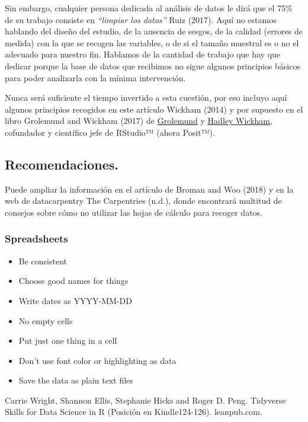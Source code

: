 \documentclass[
  letterpaper,
  DIV=11,
  numbers=noendperiod]{scrreprt}
\providecommand{\tightlist}{%
  \setlength{\itemsep}{0pt}\setlength{\parskip}{0pt}}\usepackage{longtable,booktabs,array}
\begin{document}
Sin embargo, cualquier persona dedicada al análisis de datos le dirá que
el 75\% de su trabajo consiste en \emph{``limpiar los datos''} Ruiz
(2017). Aquí no estamos hablando del diseño del estudio, de la ausencia
de sesgos, de la calidad (errores de medida) con la que se recogen las
variables, o de si el tamaño muestral es o no el adecuado para nuestro
fin. Hablamos de la cantidad de trabajo que hay que dedicar porque la
base de datos que recibimos no sigue algunos principios básicos para
poder analizarla con la mínima intervención.

Nunca será suficiente el tiempo invertido a esta cuestión, por eso
incluyo aquí algunos principios recogidos en este artículo Wickham
(2014) y por supuesto en el libro Grolemund and Wickham (2017) de
\href{https://www.rstudio.com/authors/garrett-grolemund/}{Grolemund} y
\href{https://hadley.nz/}{Hadley Wickham}, cofundador y científico jefe
de RStudio™ (ahora Posit™).

\hypertarget{recomendaciones.}{%
\subsection{Recomendaciones.}\label{recomendaciones.}}

Puede ampliar la información en el artículo de Broman and Woo (2018) y
en la web de datacarpentry The Carpentries (n.d.), donde encontrará
multitud de consejos sobre cómo no utilizar las hojas de cálculo para
recoger datos.

\hypertarget{spreadsheets}{%
\subsubsection{Spreadsheets}\label{spreadsheets}}

\begin{itemize}
\tightlist
\item
  Be consistent
\item
  Choose good names for things
\item
  Write dates as YYYY-MM-DD
\item
  No empty cells
\item
  Put just one thing in a cell
\item
  Don't use font color or highlighting as data
\item
  Save the data as plain text files
\end{itemize}

Carrie Wright, Shannon Ellis, Stephanie Hicks and Roger D. Peng.
Tidyverse Skills for Data Science in R (Posición en Kindle124-126).
leanpub.com.
\end{document}
